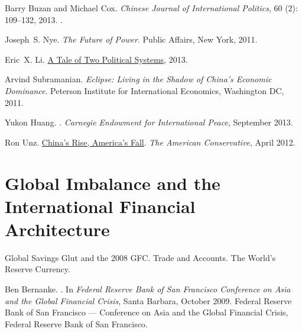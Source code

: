 \documentclass[%
 11pt%
]{article}
\begin{document}
\bigskip

Barry Buzan and Michael Cox.
\newblock \emph{Chinese Journal of International Politics}, 60
  (2): 109--132, 2013.
.
\medskip

Joseph~S. Nye.
\newblock \emph{{The Future of Power}}.
\newblock Public Affairs, New York, 2011.
\medskip

Eric~X. Li.
\newblock
\href{http://www.ted.com/talks/eric\_x\_li\_a\_tale\_of\_two\_political\_systems.html}{A
  Tale of Two Political Systems}, 2013.
\medskip

Arvind Subramanian.
\newblock \emph{{Eclipse: Living in the Shadow of China's Economic Dominance}}.
\newblock Peterson Institute for International Economics, Washington
DC, 2011.
\medskip

Yukon Huang.
.
\newblock \emph{Carnegie Endowment for International Peace}, September
2013.
\medskip

Ron Unz.
\newblock
    {\href{http://www.theamericanconservative.com/blog/chinas-rise-americas-fall/}{China’s Rise, America’s Fall}}.
\newblock \emph{The American Conservative}, April 2012.
\medskip

\section{Global Imbalance and the International Financial Architecture}

Global Savings Glut and the 2008 GFC.
Trade and Accounts.
The World's Reserve Currency.

\nocite{Bernanke-B-Asia-GFC-2009}
\nocite{Xing-Y-N-Detert-iPhone-Trade-Deficit-2010}
\nocite{Eichengreen-B-Flandreau-M-The-Rise-and-Fall-of-the-Dollar-2008}
\nocite{Chinn-M-Frankel-J-Why-the-Euro-Will-Rival-the-Dollar-2008}
\nocite{WTO-WTR-2013}

\bigskip
Ben Bernanke.
.
\newblock In \emph{Federal Reserve Bank of San Francisco Conference on Asia and
  the Global Financial Crisis}, Santa Barbara, October 2009. Federal Reserve
  Bank of San Francisco --- Conference on Asia and the Global Financial Crisis,
  Federal Reserve Bank of San Francisco.
\medskip
\end{document}
